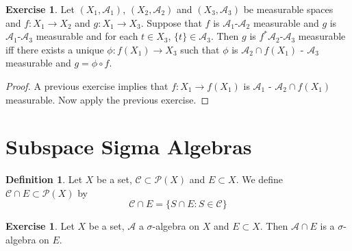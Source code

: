 \documentclass{book}
\theoremstyle{definition}
\newtheorem{defn}[definition]{Definition}
\newtheorem{ex}[definition]{Exercise}
\newcommand{\sig}{\sigma}
\newcommand{\MA}{\mathcal{A}}
\newcommand{\MC}{\mathcal{C}}
\newcommand{\MP}{\mathcal{P}}
\newcommand{\lex}[1]{\label{ex:#1}}
\newcommand{\ld}[1]{\label{defn:#1}}
\DeclareMathOperator*{\0}{\mbf{0}}
\DeclareMathOperator*{\1}{\mbf{1}}
\begin{document}
	\begin{ex}
		Let $(X_1, \MA_1)$, $(X_2, \MA_2)$ and $(X_3, \MA_3)$ be measurable spaces and $f: X_1 \rightarrow X_2$ and $g:X_1 \rightarrow X_3$. Suppose that $f$ is $\MA_1$-$\MA_2$ measurable and $g$ is $\MA_1$-$\MA_3$ measurable and for each $t \in X_3$, $\{t\} \in \MA_3$. Then $g$ is $f^*\MA_2$-$\MA_3$ measurable iff there exists a unique $\phi: f(X_1) \rightarrow X_3$ such that $\phi$ is $\MA_2 \cap f(X_1)$ - $\MA_3$ measurable and $g = \phi \circ f$. \\
	\end{ex}
	
	\begin{proof}
		A previous exercise implies that $f: X_1 \rightarrow f(X_1)$ is $\MA_1$ - $\MA_2 \cap f(X_1)$ measurable. Now apply the previous exercise. 
	\end{proof}


	
	
	
	
	
	
	
	
	
	
	
	
	
	
	
	
	
	
	
	
	
	
	
	
	
	\newpage
	\section{Subspace Sigma Algebras}
	
	\begin{defn} \ld{24001} 
		Let $X$ be a set, $\MC \subset \MP(X)$ and $E \subset X$. We define $\MC \cap E \subset \MP(X)$ by $$\MC \cap E = \{S \cap E: S \in \MC\}$$ 
	\end{defn}
	
	\begin{ex} \lex{24002} 
		Let $X$ be a set, $\MA$ a $\sig$-algebra on $X$ and $E \subset X$. Then 
		$\MA \cap E$ is a $\sig$-algebra on $E$. 
	\end{ex}
	
\end{document}
